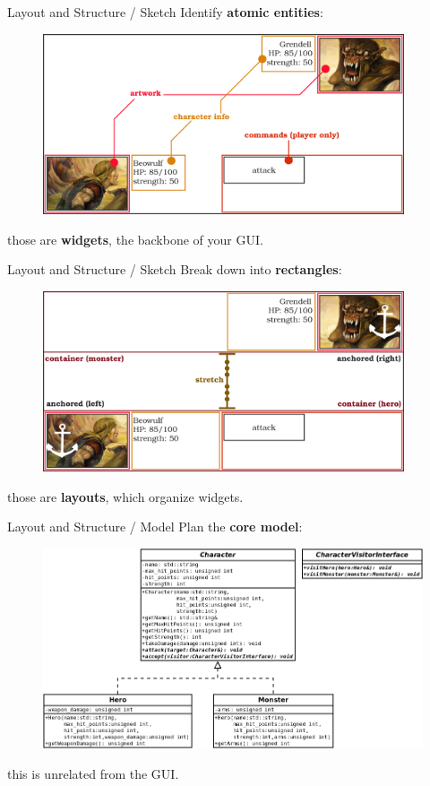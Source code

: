 \documentclass[11pt]{beamer}
\renewcommand{\emph}[1]{\textbf{#1}}
\begin{document}
\begin{frame}{Layout and Structure / Sketch}
 Identify \emph{atomic entities}:
 \begin{figure}
  \includegraphics[width=0.95\textwidth]{assets/figure-battle-scene-2}
 \end{figure}
 those are \emph{widgets}, the backbone of your GUI.
\end{frame}

\begin{frame}{Layout and Structure / Sketch}
 Break down into \emph{rectangles}:
 \begin{figure}
  \includegraphics[width=0.95\textwidth]{assets/figure-battle-scene-3}
 \end{figure}
 those are \emph{layouts}, which organize widgets.
\end{frame}

\begin{frame}{Layout and Structure / Model}
 Plan the \emph{core model}:
 \begin{figure}
  \includegraphics[height=0.65\textheight]{assets/diagram-battle-scene}
 \end{figure}
 this is unrelated from the GUI.
\end{frame}
\end{document}
